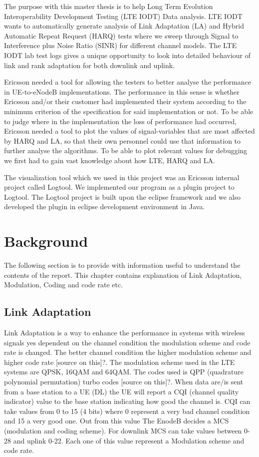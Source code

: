 \documentclass[cropmarks, frame, english]{idamasterthesis}
\begin{document}
The purpose with this master thesis is to help Long Term Evolution Interoperability Development Testing (LTE IODT) Data analysis. LTE IODT wants to automatically generate analysis of Link Adaptation (LA) and Hybrid Automatic Repeat Request (HARQ) tests where we sweep through Signal to Interference plus Noise Ratio (SINR) for different channel models. The LTE IODT lab test logs gives a unique opportunity to look into detailed behaviour of link and rank adaptation for both downlink and uplink. \newline


Ericsson needed a tool for allowing the testers to better analyse the performance in UE-to-eNodeB implementations. The performance in this sense is whether Ericsson and/or their customer had implemented their system according to the minimum criterion of the specification for said implementation or not. To be able to judge where in the implementation the loss of performance had occurred, Ericsson needed a tool to plot the values of signal-variables that are most affected by HARQ and LA, so that their own personnel could use that information to further analyse the algorithms. To be able to plot relevant values for debugging we first had to gain vast knowledge about how LTE, HARQ and LA. \newline


The visualization tool which we used in this project was an Ericsson internal project called Logtool. We implemented our program as a plugin project to Logtool. The Logtool project is built upon the eclipse framework and we also developed the plugin in eclipse development environment in Java. 
\section{Background}
The following section is to provide with information useful to understand the contents of the report. This chapter contains explanation of Link Adaptation, Modulation, Coding and code rate etc.
\subsection{Link Adaptation}
Link Adaptation is a way to enhance the performance in systems with wireless signals yes dependent on the channel condition the modulation scheme and code rate is changed. The better channel condition the higher modulation scheme and higher code rate [source on this]?. The modulation scheme used in the LTE systems are QPSK, 16QAM and 64QAM. The codes used is QPP (quadrature polynomial permutation) turbo codes [source on this]?. When data are/is sent from a base station to a UE (DL) the UE will report a CQI (channel quality indicator) value to the base station indicating how good the channel is. CQI can take values from 0 to 15 (4 bits) where 0 represent a very bad channel condition and 15 a very good one. Out from this value The EnodeB decides a MCS (modulation and coding scheme). For downlink MCS can take values between 0-28 and uplink 0-22. Each one of this value represent a Modulation scheme and code rate. 
\end{document}
